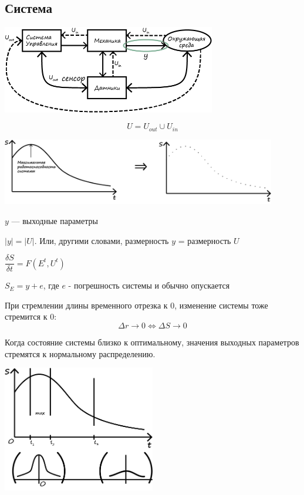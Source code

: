 \documentclass[12pt]{article}
\begin{document}
\begin{sloppypar}
    \subsection*{Система}

    \begin{center}
        \includegraphics[width=0.7\textwidth]{graphics/Система.png}
    \end{center}

    \[
        U = U_{out} \cup U_{in}
    \]

    \includegraphics[width=0.9\textwidth]{graphics/Состояние системы.png}

    $y$ — выходные параметры

    $|y| = |U|$. Или, другими словами, размерность $y$ = размерность $U$

    $\dfrac{\delta S}{\delta t} = F(E^t, U^t)$

    $S_E = y + e$, где $e$ - погрешность системы и обычно опускается

    При стремлении длины временного отрезка к 0, изменение системы тоже стремится к 0:
    \[
        \Delta r \rightarrow 0 \Leftrightarrow \Delta S \rightarrow 0
    \]

    Когда состояние системы близко к оптимальному, значения выходных параметров стремятся к нормальному распределению.

    \includegraphics[width=0.5\textwidth]{graphics/Состояния системы и нормальное распределение.png}


\end{sloppypar}
\end{document}
